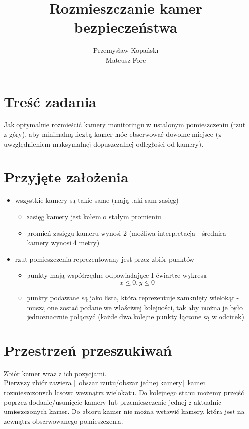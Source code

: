 \documentclass[12pt,a4paper]{article}
\title{Rozmieszczanie kamer bezpieczeństwa}
\author{Przemysław Kopański \\ Mateusz Forc}
\begin{document}
\maketitle
\tableofcontents
\section{Treść zadania}
Jak optymalnie rozmieścić kamery monitoringu w ustalonym pomieszczeniu (rzut z góry),
aby minimalną liczbą kamer móc obserwować dowolne miejsce 
(z uwzględnieniem maksymalnej dopuszczalnej odległości od kamery).
%
\newpage
\section{Przyjęte założenia}
\begin{itemize}
\item wszystkie kamery są takie same (mają taki sam zasięg)
	\begin{itemize}
	\item zasięg kamery jest kołem o stałym promieniu
	\item promień zasięgu kameru wynosi 2 (możliwa interpretacja - średnica kamery wynosi 4 metry)
	\end{itemize}
\item rzut pomieszczenia reprezentowany jest przez zbiór punktów
	\begin{itemize}
	\item punkty mają współrzędne odpowiadające I ćwiartce wykresu \[x \leq 0, y \leq 0\]
	\item punkty podawane są jako lista, która reprezentuje zamknięty wielokąt - muszą one zostać
	      podane we właściwej kolejności, tak aby można je było jednoznacznie połączyć 
	      (każde dwa kolejne punkty łączone są w odcinek)
	\end{itemize}
\end{itemize}
%
\section{Przestrzeń przeszukiwań}
Zbiór kamer wraz z ich pozycjami. \\
Pierwszy zbiór zawiera $\lceil$ obszar rzutu/obszar jednej kamery$\rceil$ kamer
rozmieszczonych losowo wewnątrz wielokątu.
Do kolejnego stanu możemy przejść poprzez dodanie/usunięcie kamery lub przemieszczenie
jednej z aktualnie umieszczonych kamer.
Do zbioru kamer nie można wstawić kamery, która jest na zewnątrz obserwowanego pomieszczenia.
%
\newpage
\end{document}
